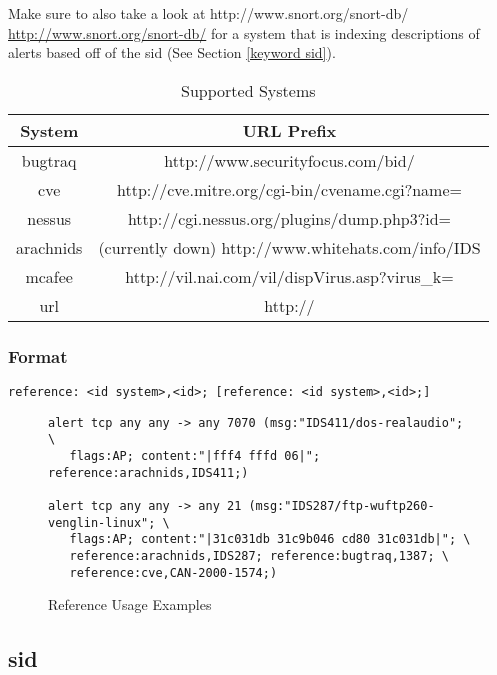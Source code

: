 \documentclass[english]{report}
\begin{document}
Make sure to also take a look at http://www.snort.org/snort-db/ \url{http://www.snort.org/snort-db/}
for a system that is indexing descriptions of alerts based off of
the sid (See Section \ref{keyword sid}).
\begin{table}[!hbpt]

\caption{Supported Systems \label{references systems}}

\begin{center}\begin{tabular}{|c|c|}
\hline 
System&
URL Prefix\\
\hline
\hline 
bugtraq&
http://www.securityfocus.com/bid/\\
\hline 
cve&
http://cve.mitre.org/cgi-bin/cvename.cgi?name=\\
\hline 
nessus &
http://cgi.nessus.org/plugins/dump.php3?id=\\
\hline 
arachnids&
(currently down) http://www.whitehats.com/info/IDS\\
\hline 
mcafee&
http://vil.nai.com/vil/dispVirus.asp?virus\_k=\\
\hline 
url&
http://\\
\hline
\end{tabular}\end{center}
\end{table}


\subsubsection{Format}

\begin{verbatim}
reference: <id system>,<id>; [reference: <id system>,<id>;]
\end{verbatim}

\begin{figure}[!hbpt]
\begin{verbatim}
alert tcp any any -> any 7070 (msg:"IDS411/dos-realaudio"; \
   flags:AP; content:"|fff4 fffd 06|"; reference:arachnids,IDS411;)

alert tcp any any -> any 21 (msg:"IDS287/ftp-wuftp260-venglin-linux"; \
   flags:AP; content:"|31c031db 31c9b046 cd80 31c031db|"; \
   reference:arachnids,IDS287; reference:bugtraq,1387; \
   reference:cve,CAN-2000-1574;)
\end{verbatim}

\caption{Reference Usage Examples\label{example reference rule}}
\end{figure}

\subsection{sid\label{keyword sid}}
\end{document}

